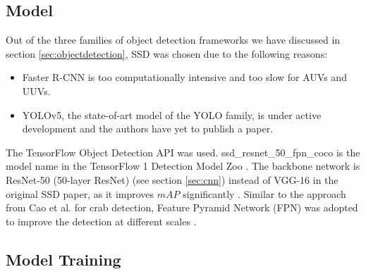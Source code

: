 \documentclass[a4paper, 11pt, oneside]{article}
\begin{document}
\subsection{Model}

Out of the three families of object detection frameworks we have discussed in section \ref{sec:objectdetection}, SSD was
chosen due to the following reasons:

\begin{itemize}
  \item Faster R-CNN is too computationally intensive and too slow for AUVs and UUVs.
  \item YOLOv5, the state-of-art model of the YOLO family, is under active development and the authors have yet to
  publish a paper.
\end{itemize}

The TensorFlow Object Detection API \cite{huang2017speed, tfobjectdetection} was used. ssd\_resnet\_50\_fpn\_coco
is the model name in the TensorFlow 1 Detection Model Zoo \cite{tf1detectionmodelzoo}. The backbone network
is ResNet-50 (50-layer ResNet) (see section \ref{sec:cnn}) instead of VGG-16 in the original SSD paper, as it
improves $mAP$ significantly \cite{he2016deep}. Similar to the approach from Cao et al. \cite{cao2020real} for crab
detection, Feature Pyramid Network (FPN) was adopted to improve the detection at different scales \cite{lin2017feature}.

\subsection{Model Training}
\end{document}
